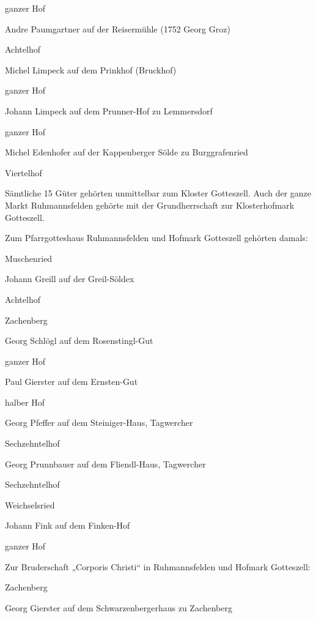 \documentclass[12pt,a4pager]{book}
\begin{document}
ganzer Hof



Andre Paumgartner auf der Reisermühle (1752 Georg Groz)

Achtelhof



Michel Limpeck auf dem Prinkhof (Bruckhof)

ganzer Hof



Johann Limpeck auf dem Prunner-Hof zu Lemmersdorf

ganzer Hof



Michel Edenhofer auf der Kappenberger Sölde zu Burggrafenried

Viertelhof



Sämtliche 15 Güter gehörten unmittelbar zum Kloster Gotteszell. Auch der ganze
Markt Ruhmannsfelden gehörte mit der Grundherrschaft zur Klosterhofmark
Gotteszell.



Zum Pfarrgotteshaus Ruhmannsfelden und Hofmark Gotteszell gehörten damals:



Muschenried

Johann Greill auf der Greil-Söldex

Achtelhof

Zachenberg

Georg Schlögl auf dem Rosenstingl-Gut

ganzer Hof



Paul Gierster auf dem Ernsten-Gut

halber Hof



Georg Pfeffer auf dem Steiniger-Haus, Tagwercher

Sechzehntelhof



Georg Prunnbauer auf dem Fliendl-Haus, Tagwercher

Sechzehntelhof

Weichselsried

Johann Fink auf dem Finken-Hof

ganzer Hof



Zur Bruderschaft „Corporis Christi“ in Ruhmannsfelden und Hofmark Gotteszell:



Zachenberg

Georg Gierster auf dem Schwarzenbergerhaus zu Zachenberg
\end{document}
